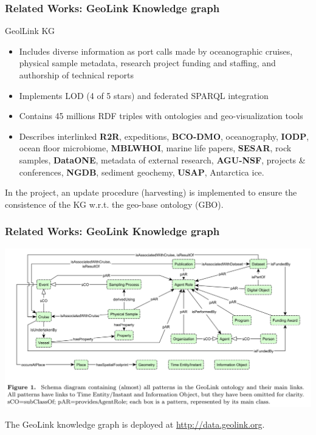 \documentclass[10pt]{beamer}
\begin{document}
\begin{frame}[fragile]
  \frametitle{Related Works: GeoLink Knowledge graph}
  GeolLink KG \cite{geolink}
  \begin{itemize}
  \item Includes diverse information as port calls made by oceanographic cruises, physical sample metadata, research project funding and staffing, and authorship of technical reports
  \item Implements LOD (4 of 5 stars) and federated SPARQL integration
  \item Contains 45 millions RDF triples with ontologies and geo-visualization tools
  \item Describes interlinked \textbf{R2R}, expeditions, \textbf{BCO-DMO}, oceanography, \textbf{IODP}, ocean floor microbiome, \textbf{MBLWHOI}, marine life papers, \textbf{SESAR}, rock samples, \textbf{DataONE}, metadata of external research,  \textbf{AGU-NSF}, projects \& conferences, \textbf{NGDB}, sediment geochemy, \textbf{USAP}, Antarctica ice.
  \end{itemize}
  In the project, an update procedure (harvesting) is implemented to ensure the consistence of the KG w.r.t. the geo-base ontology (GBO).
\end{frame}

\begin{frame}
  \frametitle{Related Works: GeoLink Knowledge graph}
  \begin{center}
  \includegraphics[width=\linewidth]{geolink-onto.png}
  \end{center}
  The GeoLink knowledge graph is deployed at \url{http://data.geolink.org}.
\end{frame}


\end{document}
